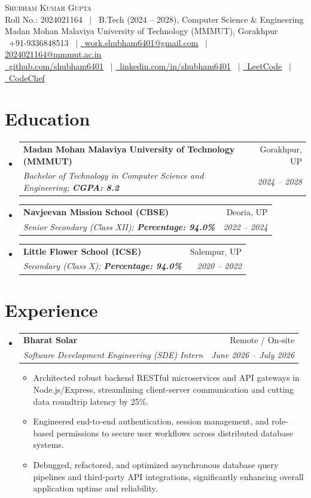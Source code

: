 \documentclass[letterpaper,10.8pt]{article}
\makeatletter
\newcommand{\resumeItem}[1]{
  \item\small{
    {#1 \vspace{-2pt}}
  }
}
\newcommand{\resumeSubheading}[4]{
  \vspace{-2pt}\item
    \begin{tabular*}{0.98\textwidth}[t]{l@{\extracolsep{\fill}}r}
      \textbf{#1} & #2 \\
      \textit{\small#3} & \textit{\small #4} \\
    \end{tabular*}\vspace{-6pt}
}
\newcommand{\resumeSubHeadingListStart}{\begin{itemize}[leftmargin=0.15in, label={}]}
\newcommand{\resumeSubHeadingListEnd}{\end{itemize}}
\newcommand{\resumeItemListStart}{\begin{itemize}[leftmargin=0.15in]}
\newcommand{\resumeItemListEnd}{\end{itemize}\vspace{-4pt}}
\makeatother
\begin{document}
\begin{center}
    {\Huge \scshape Shubham Kumar Gupta} \\ \vspace{2pt}
    \small Roll No.: 2024021164 \ $|$ \ B.Tech (2024 -- 2028), Computer Science \& Engineering \\
    \small Madan Mohan Malaviya University of Technology (MMMUT), Gorakhpur \\ \vspace{3pt}
    \small \faPhone\ +91-9336848513 \ $|$ 
    \href{mailto:work.shubham6401@gmail.com}{\faEnvelope\ \underline{work.shubham6401@gmail.com}} \ $|$ 
    \href{mailto:2024021164@mmmut.ac.in}{\underline{2024021164@mmmut.ac.in}} \\ \vspace{2pt}
    \href{https://github.com/shubham6401}{\faGithub\ \underline{github.com/shubham6401}} \ $|$ 
    \href{https://www.linkedin.com/in/shubham6401}{\faLinkedin\ \underline{linkedin.com/in/shubham6401}} \ $|$
    \href{https://leetcode.com/u/shubham6401/}{\faCode\ \underline{LeetCode}} \ $|$
    \href{https://www.codechef.com/users/shubham6401}{\faTrophy\ \underline{CodeChef}}
\end{center}
\vspace{-10pt}

\section{Education}
  \resumeSubHeadingListStart
    \resumeSubheading
      {Madan Mohan Malaviya University of Technology (MMMUT)}{Gorakhpur, UP}
      {Bachelor of Technology in Computer Science and Engineering; \textbf{CGPA: 8.2}}{2024 -- 2028}
    \resumeSubheading
      {Navjeevan Mission School (CBSE)}{Deoria, UP}
      {Senior Secondary (Class XII); \textbf{Percentage: 94.0\%}}{2022 -- 2024}
    \resumeSubheading
      {Little Flower School (ICSE)}{Salempur, UP}
      {Secondary (Class X); \textbf{Percentage: 94.0\%}}{2020 -- 2022}
  \resumeSubHeadingListEnd
\vspace{-6pt}

\section{Experience}
  \resumeSubHeadingListStart
    \resumeSubheading
      {Bharat Solar}{Remote / On-site}
      {Software Development Engineering (SDE) Intern}{June 2026 -- July 2026}
      \resumeItemListStart
        \resumeItem{Architected robust backend RESTful microservices and API gateways in Node.js/Express, streamlining client-server communication and cutting data roundtrip latency by 25\%.}
        \resumeItem{Engineered end-to-end authentication, session management, and role-based permissions to secure user workflows across distributed database systems.}
        \resumeItem{Debugged, refactored, and optimized asynchronous database query pipelines and third-party API integrations, significantly enhancing overall application uptime and reliability.}
      \resumeItemListEnd
  \resumeSubHeadingListEnd
\vspace{-6pt}
\end{document}
